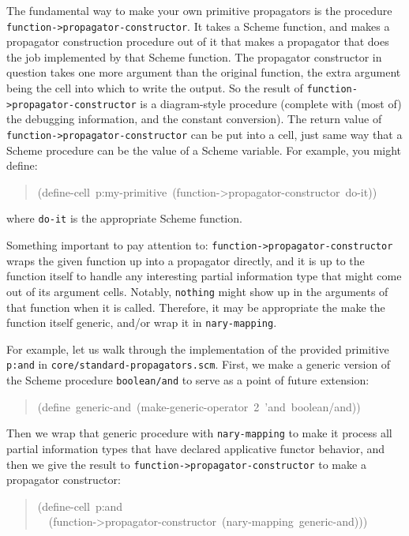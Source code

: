 \documentclass[12pt,letterpaper,english]{article}
\begin{document}
The fundamental way to make your own primitive propagators is
the procedure \texttt{function->propagator-constructor}.  It takes a Scheme
function, and makes a propagator construction procedure out of it that
makes a propagator that does the job implemented by that Scheme
function.  The propagator constructor in question takes one more
argument than the original function, the extra argument being the cell
into which to write the output.  So the result of
\texttt{function->propagator-constructor} is a diagram-style procedure
(complete with (most of) the debugging information, and the constant
conversion).  The return value of \texttt{function->propagator-constructor}
can be put into a cell, just same way that a Scheme procedure
can be the value of a Scheme variable.  For example, you might define:
\begin{quote}{\ttfamily \raggedright \noindent
(define-cell~p:my-primitive~(function->propagator-constructor~do-it))
}\end{quote}
where \texttt{do-it} is the appropriate Scheme function.

Something important to pay attention to: \texttt{function->propagator-constructor}
wraps the given function up into a propagator directly, and it is up
to the function itself to handle any interesting partial information
type that might come out of its argument cells.  Notably, \texttt{nothing}
might show up in the arguments of that function when it is called.
Therefore, it may be appropriate the make the function itself generic,
and/or wrap it in \texttt{nary-mapping}.

For example, let us walk through the implementation of the provided
primitive \texttt{p:and} in \texttt{core/standard-propagators.scm}.  First, we
make a generic version of the Scheme procedure \texttt{boolean/and} to
serve as a point of future extension:
\begin{quote}{\ttfamily \raggedright \noindent
(define~generic-and~(make-generic-operator~2~'and~boolean/and))
}\end{quote}

Then we wrap that generic procedure with \texttt{nary-mapping} to make it
process all partial information types that have declared applicative
functor behavior, and then we give the result to
\texttt{function->propagator-constructor} to make a propagator
constructor:
\begin{quote}{\ttfamily \raggedright \noindent
(define-cell~p:and~\\
~~(function->propagator-constructor~(nary-mapping~generic-and)))
}\end{quote}
\end{document}
